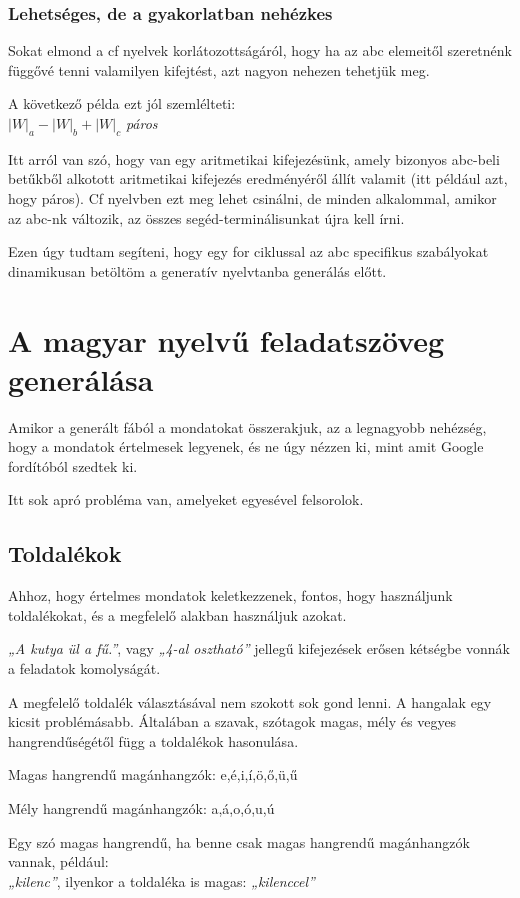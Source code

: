 \documentclass[12pt]{report}
\theoremstyle{definition}
\begin{document}
\subsection*{Lehetséges, de a gyakorlatban nehézkes}
Sokat elmond a cf nyelvek korlátozottságáról, hogy ha az abc elemeitől szeretnénk függővé tenni valamilyen kifejtést, azt nagyon nehezen tehetjük meg.

A következő példa ezt jól szemlélteti:\\
$|W|_a - |W|_b + |W|_c$ \textit{páros}

Itt arról van szó, hogy van egy aritmetikai kifejezésünk, amely bizonyos abc-beli betűkből alkotott aritmetikai kifejezés eredményéről állít valamit (itt például azt, hogy páros). Cf nyelvben ezt meg lehet csinálni, de minden alkalommal, amikor az abc-nk változik, az összes segéd-terminálisunkat újra kell írni.

Ezen úgy tudtam segíteni, hogy egy for ciklussal az abc specifikus szabályokat dinamikusan betöltöm a generatív nyelvtanba generálás előtt.

\chapter{A magyar nyelvű feladatszöveg generálása}
Amikor a generált fából a mondatokat összerakjuk, az a legnagyobb nehézség, hogy a mondatok értelmesek legyenek, és ne úgy nézzen ki, mint amit Google fordítóból szedtek ki.

Itt sok apró probléma van, amelyeket egyesével felsorolok.

\section{Toldalékok}
Ahhoz, hogy értelmes mondatok keletkezzenek, fontos, hogy használjunk toldalékokat, és a megfelelő alakban használjuk azokat.

\textit{„A kutya ül a fű.”}, vagy \textit{„4-al osztható”} jellegű kifejezések erősen kétségbe vonnák a feladatok komolyságát.

A megfelelő toldalék választásával nem szokott sok gond lenni. A hangalak egy kicsit problémásabb. Általában a szavak, szótagok magas, mély és vegyes hangrendűségétől függ a toldalékok hasonulása.

Magas hangrendű magánhangzók: e,é,i,í,ö,ő,ü,ű

Mély hangrendű magánhangzók:  a,á,o,ó,u,ú

Egy szó magas hangrendű, ha benne csak magas hangrendű magánhangzók vannak, például:\\ \textit{„kilenc”}, ilyenkor a toldaléka is magas: \textit{„kilenccel”}
\end{document}

